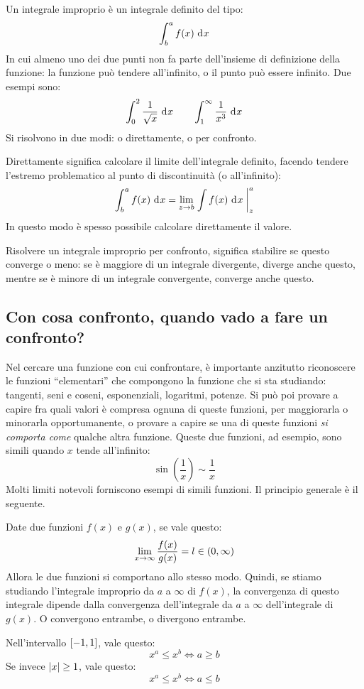 Un integrale improprio \`e un integrale definito del tipo:
\[
\int_{b}^{a} f(x) \dx
\]
In cui almeno uno dei due punti non fa parte dell'insieme di definizione
della funzione: la funzione pu\`o tendere all'infinito, o il punto pu\`o 
essere infinito. Due esempi sono:
\[
\int_{0}^{2} \frac{1}{\sqrt{x}} \dx \qquad 
\int_{1}^{\infty} \frac{1}{x^3} \dx
\]
Si risolvono in due modi: o direttamente, o per confronto.

Direttamente significa calcolare il limite dell'integrale definito, 
facendo tendere l'estremo problematico al punto di discontinuit\`a (o 
all'infinito):
\[
\int_{b}^{a} f(x) \dx = \lim_{z \to b} \increment{\int f(x) \dx}_{z}^{a}
\]
In questo modo \`e spesso possibile calcolare direttamente il valore.

Risolvere un integrale improprio per confronto, significa stabilire se 
questo converge o meno: se \`e maggiore di un integrale divergente, 
diverge anche questo, mentre se \`e minore di un integrale convergente, 
converge anche questo.

\subsection{Con cosa confronto, quando vado a fare un confronto?}

Nel cercare una funzione con cui confrontare, \`e importante anzitutto 
riconoscere le funzioni ``elementari'' che compongono la funzione che 
si sta studiando: tangenti, seni e coseni, esponenziali, logaritmi, 
potenze. Si pu\`o poi provare a capire fra quali valori \`e compresa
ognuna di queste funzioni, per maggiorarla o minorarla opportumanente, 
o provare a capire se una di queste funzioni \emph{si comporta come} 
qualche altra funzione. Queste due funzioni, ad esempio, sono simili 
quando $x$ tende all'infinito:
\[
\sin \left( \frac{1}{x} \right) \sim \frac{1}{x}
\]
Molti limiti notevoli forniscono esempi di simili funzioni. Il principio
generale \`e il seguente.

Date due funzioni $f(x)$ e $g(x)$, se vale questo:
\[
\lim_{x \to \infty} \frac{f(x)}{g(x)} = l \in \left( {0}, {\infty} \right)
\]
Allora le due funzioni si comportano allo stesso modo. Quindi, se stiamo 
studiando l'integrale improprio da $a$ a $\infty$ di $f(x)$, la convergenza 
di questo integrale dipende dalla convergenza dell'integrale da $a$ a 
$\infty$ dell'integrale di $g(x)$. O convergono entrambe, o divergono 
entrambe.

Nell'intervallo $\left[ {-1}, {1} \right]$, vale questo:
\[
x^a \le x^b \iff a \ge b
\]
Se invece $\left\lvert{x}\right\rvert \ge 1$, vale questo:
\[
x^a \le x^b \iff a \le b
\]

